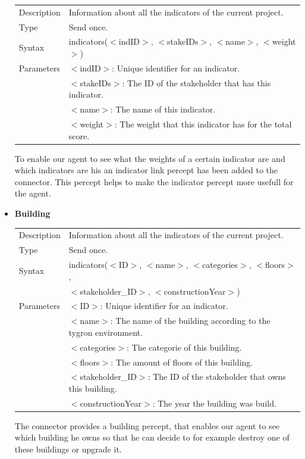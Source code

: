\begin{itemize}
	\begin{tabular}{ l l }
 		 Description & Information about all the indicators of the current project.  \\
  		Type & Send once. \\
 		 Syntax & indicators($<$indID$>$, $<$stakeIDs$>$, $<$name$>$, $<$weight$>$) \\
  		Parameters &  $<$indID$>$: Unique identifier for an indicator. 
				\\& $<$stakeIDs$>$: The ID of the stakeholder that has this indicator. 
				\\& $<$name$>$: The name of this indicator. 
				\\& $<$weight$>$: The weight that this indicator has for the total score. 
	\end{tabular}
	To enable our agent to see what the weights of a certain indicator are and which indicators are his an indicator link percept has been added to the connector. This percept helps to make the indicator percept more usefull for the agent.
	\item \textbf{Building} \\ 
	\begin{tabular}{ l l }
 		 Description & Information about all the indicators of the current project.  \\
  		Type & Send once. \\
 		 Syntax & indicators($<$ID$>$, $<$name$>$, $<$categories$>$, $<$floors$>$, \\
		& $<$stakeholder\_ID$>$, $<$constructionYear$>$) \\
  		Parameters &  $<$ID$>$: Unique identifier for an indicator. 
				\\& $<$name$>$: The name of the building according to the tygron environment.
				\\& $<$categories$>$: The categorie of this building.
				\\& $<$floors$>$: The amount of floors of this building.
				\\& $<$stakeholder\_ID$>$: The ID of the stakeholder that owns this building.
				\\& $<$constructionYear$>$: The year the building was build.
	\end{tabular}
	The connector provides a building percept, that enables our agent to see which building he owns so that he can decide to for example destroy one of these buildings or upgrade it.

\end{itemize}

